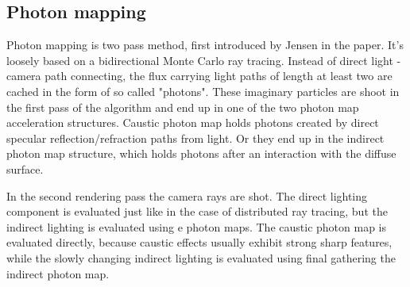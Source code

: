 \subsection{Photon mapping}
Photon mapping is two pass method, first introduced by Jensen in the \cite{Jensen:1996} paper. It's loosely based on a bidirectional Monte Carlo ray tracing. Instead of direct light - camera path connecting, the flux carrying light paths of length at least two are cached in the form of so called "photons". These imaginary particles are shoot in the first pass of the algorithm and end up in one of the two photon map acceleration structures. Caustic photon map holds photons created by direct specular reflection/refraction paths from light. Or they end up in the indirect photon map structure, which holds photons after an interaction with the diffuse surface.

In the second rendering pass the camera rays are shot. The direct lighting component is evaluated just like in the case of distributed ray tracing, but the indirect lighting is evaluated using e photon maps. The caustic photon map is evaluated directly, because caustic effects usually exhibit strong sharp features, while the slowly changing indirect lighting is evaluated using final gathering the indirect photon map.


